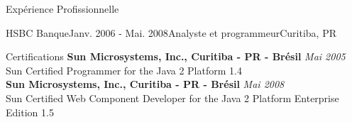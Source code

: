 \documentclass{resume}
\begin{document}
\begin{rSection}{Expérience Profissionnelle}
\begin{rSubsection}{HSBC Banque}{Janv. 2006 - Mai. 2008}{Analyste et programmeur}{Curitiba, PR}
    \end{rSubsection}
  \end{rSection}

  \begin{rSection}{Certifications}
    {\bf Sun Microsystems, Inc., Curitiba - PR - Brésil} \hfill {\em Mai 2005} \\ 
    {Sun Certified Programmer for the Java 2 Platform 1.4} \\

    {\bf Sun Microsystems, Inc., Curitiba - PR - Brésil} \hfill {\em Mai 2008} \\ 
    {Sun Certified Web Component Developer for the Java 2 Platform Enterprise Edition 1.5} \\
  \end{rSection}
  
\end{document}
